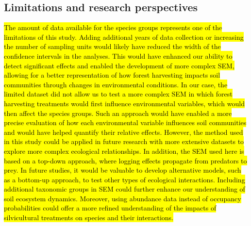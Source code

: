 \subsection*{Limitations and research perspectives}
\label{disc:limitations_opening}

\hl{The amount of data available for the species groups represents one of the limitations of this study. 
Adding additional years of data collection or increasing the number of sampling units would likely have reduced the width of the confidence intervals in the analyses. 
This would have enhanced our ability to detect significant effects and enabled the development of more complex SEM, 
allowing for a better representation of how forest harvesting impacts soil communities through changes in environmental conditions. 
In our case, the limited dataset did not allow us to test a more complex SEM in which forest harvesting treatments would first influence environmental variables, which would then affect the species groups. 
Such an approach would have enabled a more precise evaluation of how each environmental variable influences soil communities and would have helped quantify their relative effects. 
However, the method used in this study could be applied in future research with more extensive datasets to explore more complex ecological relationships. 
In addition, the SEM used here is based on a top-down approach, where logging effects propagate from predators to prey. 
In future studies, it would be valuable to develop alternative models, such as a bottom-up approach, to test other types of ecological interactions. 
Including additional taxonomic groups in SEM could further enhance our understanding of soil ecosystem dynamics. 
Moreover, using abundance data instead of occupancy probabilities could offer a more refined understanding of the impacts of silvicultural treatments on species and their interactions. }


